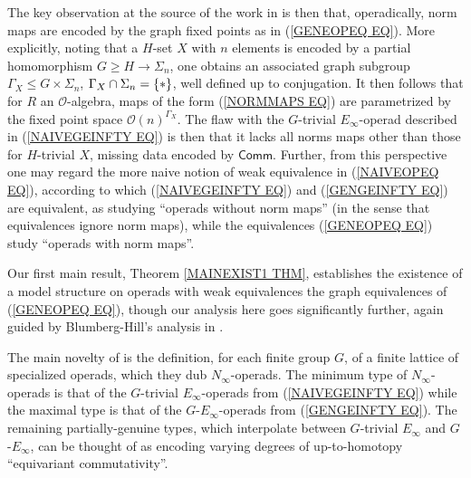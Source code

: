 \documentclass[a4paper,10pt]{article}%
\begin{document}
The key observation at the source of the work in 
\cite{BH15} is then that, operadically, 
norm maps are encoded by the graph fixed points as in (\ref{GENEOPEQ EQ}).
More explicitly, noting that a $H$-set $X$ with $n$ elements 
is encoded by a partial homomorphism 
$G \geq H \to \Sigma_n$, 
one obtains an associated graph subgroup 
$\Gamma_X \leq G \times \Sigma_n$, 
$\Gamma_X \cap \Sigma_n =\{\**\}$, well defined up to conjugation. It then follows that for $R$ an 
$\mathcal{O}$-algebra, maps of the form (\ref{NORMMAPS EQ})
are parametrized by the fixed point space
$\mathcal{O}(n)^{\Gamma_X}$.
The flaw with the $G$-trivial $E_{\infty}$-operad
described in (\ref{NAIVEGEINFTY EQ}) is then that it lacks all norms maps other than those for $H$-trivial $X$, missing data encoded by $\mathsf{Comm}$.
Further, from this perspective one may regard the more naive notion of weak equivalence in (\ref{NAIVEOPEQ EQ}),
according to which (\ref{NAIVEGEINFTY EQ}) and (\ref{GENGEINFTY EQ}) are equivalent,
as studying ``operads without norm maps''
(in the sense that equivalences ignore norm maps), 
while the equivalences (\ref{GENEOPEQ EQ})
study ``operads with norm maps''.

Our first main result, Theorem \ref{MAINEXIST1 THM}, 
establishes the existence of a model structure on operads with weak equivalences the graph equivalences of (\ref{GENEOPEQ EQ}),
though our analysis here goes significantly further, again guided by Blumberg-Hill's analysis in \cite{BH15}.

The main novelty of \cite{BH15} is the definition, for each finite group $G$, of a finite lattice of specialized operads, which they dub $N_{\infty}$-operads.
The minimum type of $N_{\infty}$-operads is that of the 
$G$-trivial $E_{\infty}$-operads from (\ref{NAIVEGEINFTY EQ}) 
while the maximal type is that of the $G$-$E_{\infty}$-operads from (\ref{GENGEINFTY EQ}).
The remaining partially-genuine types, which interpolate between 
$G$-trivial $E_{\infty}$ and $G$-$E_{\infty}$, 
can be thought of as encoding varying degrees of up-to-homotopy ``equivariant commutativity''.
\end{document}
